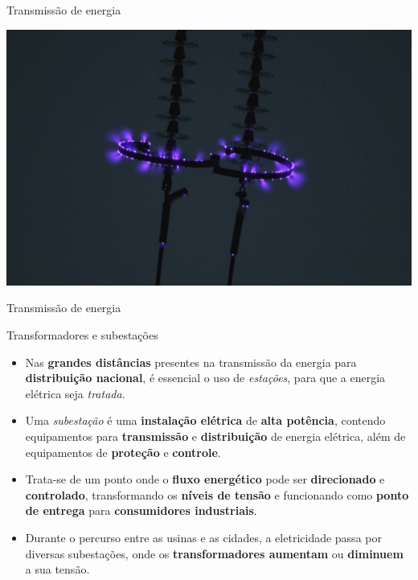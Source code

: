 \begin{frame}{Transmissão de energia}

	\centering
	\includegraphics[width=\linewidth]{Figuras/Ch03/fig12}
\end{frame}


\begin{frame}{Transmissão de energia}
	\begin{block}{Transformadores e subestações}
		\begin{itemize}
			\item Nas \textbf{grandes distâncias} presentes na transmissão da energia para \textbf{distribuição nacional}, é essencial o uso de \textit{estações}, para que a energia elétrica seja \textit{tratada}.
			\item Uma \textit{subestação} é uma \textbf{instalação elétrica} de \textbf{alta potência}, contendo equipamentos para \textbf{transmissão }e \textbf{distribuição }de energia elétrica, além de equipamentos de \textbf{proteção} e \textbf{controle}.
			\item Trata-se de um ponto onde o \textbf{fluxo energético} pode ser \textbf{direcionado} e \textbf{controlado}, transformando os \textbf{níveis de tensão }e funcionando como \textbf{ponto de entrega }para \textbf{consumidores industriais}.
			\item Durante o percurso entre as usinas e as cidades, a eletricidade passa por diversas subestações, onde os \textbf{transformadores aumentam} ou \textbf{diminuem }a sua tensão.
		\end{itemize}
	\end{block}

\end{frame}


